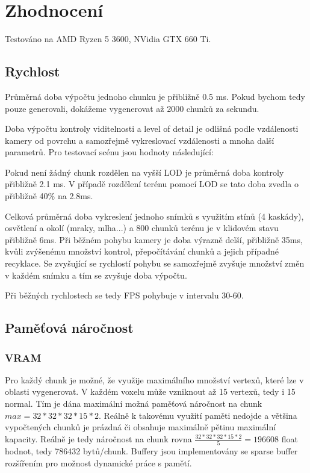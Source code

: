 \documentclass[12pt,a4paper,titlepage,final]{report}
\begin{document}
\section{Zhodnocení}
Testováno na AMD Ryzen 5 3600, NVidia GTX 660 Ti. 

\subsection{Rychlost}
Průměrná doba výpočtu jednoho chunku je přibližně 0.5 ms. Pokud bychom tedy pouze generovali, dokážeme vygenerovat až 2000 chunků za sekundu.

Doba výpočtu kontroly viditelnosti a level of detail je odlišná podle vzdálenosti kamery od povrchu a samozřejmě vykreslovací vzdálenosti a mnoha další parametrů. Pro testovací scénu jsou hodnoty následující:

Pokud není žádný chunk rozdělen na vyšší LOD je průměrná doba kontroly přibližně 2.1 ms. V případě rozdělení terénu pomocí LOD se tato doba zvedla o přibližně 40\% na 2.8ms.

Celková průměrná doba vykreslení jednoho snímků s využitím stínů (4 kaskády), osvětlení a okolí (mraky, mlha...) a 800 chunků terénu je v klidovém stavu přibližně 6ms. Při běžném pohybu kamery je doba výrazně delší, přibližně 35ms, kvůli zvýšenému množství kontrol, přepočítávání chunků a jejich případné recyklace. Se zvyšující se rychlostí pohybu se samozřejmě zvyšuje množství změn v každém snímku a tím se zvyšuje doba výpočtu.

Při běžných rychlostech se tedy FPS pohybuje v intervalu 30-60.

\subsection{Paměťová náročnost}
\subsubsection{VRAM}
Pro každý chunk je možné, že využije maximálního množství vertexů, které lze v oblasti vygenerovat. V každém voxelu může vzniknout až 15 vertexů, tedy i 15 normal. Tím je dána maximální možná paměťová náročnost na chunk $max = 32*32*32 * 15 * 2$. Reálně k takovému využití paměti nedojde a většina vypočtených chunků je prázdná či obsahuje maximálně pětinu maximální kapacity. Reálně je tedy náročnost na chunk rovna $\frac{32 * 32 * 32 * 15 * 2}{5} = 196608$ float hodnot, tedy 786432 bytů/chunk. Buffery jsou implementovány se sparse buffer rozšířením pro možnost dynamické práce s pamětí.
\end{document}
